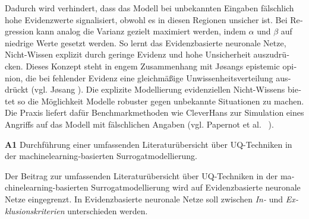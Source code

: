 \begin{otherlanguage}{ngerman}
Dadurch wird verhindert, dass das Modell bei unbekannten Eingaben fälschlich hohe Evidenzwerte signalisiert, obwohl es in diesen Regionen unsicher ist. Bei Regression kann analog die Varianz gezielt maximiert werden, indem \(\alpha\) und \(\beta\) auf niedrige Werte gesetzt werden. So lernt das \gls{Evidenzbasierte neuronale Netze}, Nicht-Wissen explizit durch geringe Evidenz und hohe Unsicherheit auszudrücken. Dieses Konzept steht in engem Zusammenhang mit Jøsangs \glqq{}epistemic opinion\grqq{}, die bei fehlender Evidenz eine gleichmäßige Unwissenheitsverteilung ausdrückt (vgl. Jøsang \parencite[S. 22]{josang2016subjective}). Die explizite Modellierung evidenziellen Nicht-Wissens bietet so die Möglichkeit Modelle robuster gegen unbekannte Situationen zu machen. Die Praxis liefert dafür Benchmarkmethoden wie CleverHans zur Simulation eines \glqq{}Angriffs\grqq{} auf das Modell mit fälschlichen Angaben (vgl. Papernot et al. ~\parencite{papernot2016cleverhans}).




\pagebreak


\textbf{A1} Durchführung einer umfassenden Literaturübersicht über UQ-Techniken in der \gls{machinelearning}-basierten Surrogatmodellierung.
\par\vspace{1\baselineskip}\noindent

Der Beitrag zur umfassenden Literaturübersicht über UQ-Techniken in der \gls{machinelearning}-basierten Surrogatmodellierung wird auf \gls{Evidenzbasierte neuronale Netze} eingegrenzt. In \gls{Evidenzbasierte neuronale Netze} soll zwischen \textit{In-} und \textit{Exklusionskriterien} unterschieden werden.


\end{otherlanguage}
